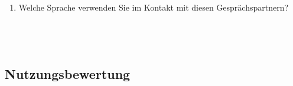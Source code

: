 \begin{enumerate}[resume]
\item Welche Sprache verwenden Sie im Kontakt mit diesen Gesprächspartnern?\\
		\underline{\hspace{7.5cm}}\\ 
       \underline{\hspace{7.5cm}}\\   
       \underline{\hspace{7.5cm}}\\   
       \underline{\hspace{7.5cm}}
\end{enumerate}
 
 

\subsection*{Nutzungsbewertung} 

